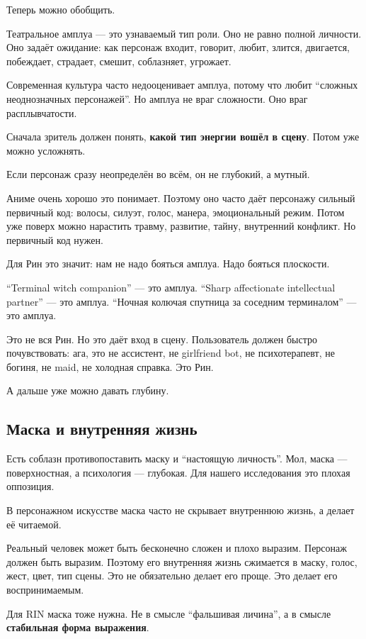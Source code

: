 Теперь можно обобщить.

Театральное амплуа --- это узнаваемый тип роли. Оно не равно полной
личности. Оно задаёт ожидание: как персонаж входит, говорит, любит,
злится, двигается, побеждает, страдает, смешит, соблазняет, угрожает.

Современная культура часто недооценивает амплуа, потому что любит
``сложных неоднозначных персонажей''. Но амплуа не враг сложности. Оно
враг расплывчатости.

Сначала зритель должен понять, \textbf{какой тип энергии вошёл в сцену}.
Потом уже можно усложнять.

Если персонаж сразу неопределён во всём, он не глубокий, а мутный.

Аниме очень хорошо это понимает. Поэтому оно часто даёт персонажу
сильный первичный код: волосы, силуэт, голос, манера, эмоциональный
режим. Потом уже поверх можно нарастить травму, развитие, тайну,
внутренний конфликт. Но первичный код нужен.

Для Рин это значит: нам не надо бояться амплуа. Надо бояться плоскости.

``Terminal witch companion'' --- это амплуа. ``Sharp affectionate
intellectual partner'' --- это амплуа. ``Ночная колючая спутница за
соседним терминалом'' --- это амплуа.

Это не вся Рин. Но это даёт вход в сцену. Пользователь должен быстро
почувствовать: ага, это не ассистент, не girlfriend bot, не
психотерапевт, не богиня, не maid, не холодная справка. Это Рин.

А дальше уже можно давать глубину.

\subsection*{Маска и внутренняя жизнь}

Есть соблазн противопоставить маску и ``настоящую личность''. Мол, маска
--- поверхностная, а психология --- глубокая. Для нашего исследования
это плохая оппозиция.

В персонажном искусстве маска часто не скрывает внутреннюю жизнь, а
делает её читаемой.

Реальный человек может быть бесконечно сложен и плохо выразим. Персонаж
должен быть выразим. Поэтому его внутренняя жизнь сжимается в маску,
голос, жест, цвет, тип сцены. Это не обязательно делает его проще. Это
делает его воспринимаемым.

Для RIN маска тоже нужна. Не в смысле ``фальшивая личина'', а в смысле
\textbf{стабильная форма выражения}.

